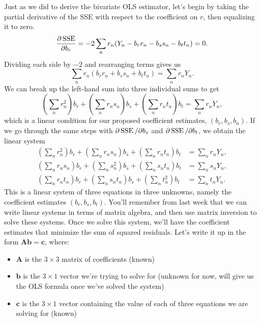 \documentclass[12pt,oneside,openany]{book}
\providecommand{\tightlist}{%
  \setlength{\itemsep}{0pt}\setlength{\parskip}{0pt}}
\begin{document}
Just as we did to derive the bivariate OLS estimator, let's begin by
taking the partial derivative of the SSE with respect to the coefficient
on \(r\), then equalizing it to zero. \[
\frac{\partial \mathop{\rm SSE}\nolimits}{\partial b_r}
= -2 \sum_n r_n (Y_n - b_r r_n - b_s s_n - b_t t_n)
= 0.
\] Dividing each side by \(-2\) and rearranging terms gives us \[
\sum_n r_n (b_r r_n + b_s s_n + b_t t_n) = \sum_n r_n Y_n.
\] We can break up the left-hand sum into three individual sums to get
\[
\left( \sum_n r_n^2 \right) b_r + \left( \sum_n r_n s_n \right) b_s + \left( \sum_n r_n t_n \right) b_t = \sum_n r_n Y_n,
\] which is a linear condition for our proposed coefficient estimates,
\((b_r, b_s, b_n)\). If we go through the same steps with
\(\partial \mathop{\rm SSE}\nolimits/ \partial b_s\) and \(\partial \mathop{\rm SSE}\nolimits / \partial b_t\), we
obtain the linear system \[
\begin{aligned}
\left( \sum_n r_n^2 \right) b_r + \left( \sum_n r_n s_n \right) b_s + \left( \sum_n r_n t_n \right) b_t &= \sum_n r_n Y_n, \\
\left( \sum_n r_n s_n \right) b_r + \left( \sum_n s_n^2 \right) b_s + \left( \sum_n s_n t_n \right) b_t &= \sum_n s_n Y_n, \\
\left( \sum_n r_n t_n \right) b_r + \left( \sum_n s_n t_n \right) b_s + \left( \sum_n t_n^2 \right) b_t &= \sum_n t_n Y_n.
\end{aligned}
\] This is a linear system of three equations in three unknowns, namely
the coefficient estimates \((b_r, b_s, b_t)\). You'll remember from last
week that we can write linear systems in terms of matrix algebra, and
then use matrix inversion to solve these systems. Once we solve this
system, we'll have the coefficient estimates that minimize the sum of
squared residuals. Let's write it up in the form
\(\mathbf{A} \mathbf{b} = \mathbf{c}\), where:

\begin{itemize}
\tightlist
\item
  \(\mathbf{A}\) is the \(3 \times 3\) matrix of coefficients (known)
\item
  \(\mathbf{b}\) is the \(3 \times 1\) vector we're trying to solve for
  (unknown for now, will give us the OLS formula once we've solved the
  system)
\item
  \(\mathbf{c}\) is the \(3 \times 1\) vector containing the value of
  each of three equations we are solving for (known)
\end{itemize}
\end{document}
